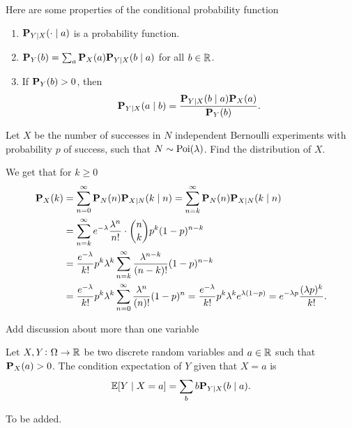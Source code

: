 \documentclass[11pt,a4paper]{article}
\begin{document}
  Here are some properties of the conditional probability function
  \begin{enumerate}
    \item $\mathbf{P}_{Y \mid X}(\cdot \mid a)$ is a probability function.
    \item $\mathbf{P}_Y(b) = \sum_{a} \mathbf{P}_X(a) \mathbf{P}_{Y \mid X}(b \mid a)$
      for all $b \in \mathbb{R}$.
    \item If $\mathbf{P}_Y(b) > 0$, then
    \[
      \mathbf{P}_{Y \mid X}(a \mid b) =
      \frac{\mathbf{P}_{Y \mid X}(b \mid a) \mathbf{P}_X(a)}{\mathbf{P}_Y(b)}.
    \]
  \end{enumerate}
  
  \begin{example}
    Let $X$ be the number of successes in $N$ independent Bernoulli experiments
    with probability $p$ of success, such that $N \sim \operatorname{Poi}(\lambda)$.
    Find the distribution of $X$.

    We get that for $k \geq 0$
    \begin{align*}
      \mathbf{P}_X(k) &= \sum_{n=0}^{\infty} \mathbf{P}_N(n) \mathbf{P}_{X \mid N}(k \mid n) =
      \sum_{n=k}^{\infty} \mathbf{P}_N(n) \mathbf{P}_{X \mid N}(k \mid n) \\
      &= \sum_{n=k}^{\infty} e^{-\lambda} \frac{\lambda^n}{n!} \cdot
        \binom{n}{k} p^k (1-p)^{n-k} \\
      &= \frac{e^{-\lambda}}{k!} p^k \lambda^k 
        \sum_{n=k}^{\infty} \frac{\lambda^{n-k}}{(n-k)!}(1-p)^{n-k} \\
      &= \frac{e^{-\lambda}}{k!} p^k \lambda^k 
        \sum_{n=0}^{\infty} \frac{\lambda^{n}}{(n)!}(1-p)^{n}
      = \frac{e^{-\lambda}}{k!} p^k \lambda^k e^{\lambda(1-p)}
      = e^{-\lambda p} \frac{(\lambda p)^{k}}{k!}.
    \end{align*}
  \end{example}

  Add discussion about more than one variable

  \begin{definition}
    Let $X,Y \colon \Omega \to \mathbb{R}$ be two discrete random variables and
    $a \in \mathbb{R}$ such that $\mathbf{P}_X(a) > 0$. The condition expectation of
    $Y$ given that $X = a$ is
    \[
      \mathbb{E}[Y \mid X = a] = \sum_{b} b \mathbf{P}_{Y \mid X}(b \mid a).
    \]
  \end{definition}

  \begin{example}
    To be added.
  \end{example}
\end{document}
